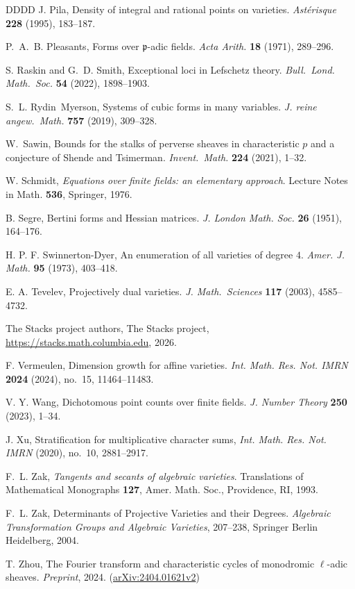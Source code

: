 \documentclass[a4paper,11pt, twoside,reqno]{amsart}
\theoremstyle{plain}
\theoremstyle{definition}
\theoremstyle{remark}
\numberwithin{equation}{section}
\begin{document}
\begin{thebibliography}{DDDD}
J. Pila,
Density of integral and rational points on varieties.
{\em Ast\'erisque} {\bf 228} (1995), 183--187.

P.~A.~B. Pleasants, Forms over ${ \mathfrak{p}}$-adic fields. {\em Acta Arith.} {\bf 18} (1971), 289--296.

S. Raskin and G.~D. Smith, Exceptional loci in Lefschetz theory. {\em Bull.\ Lond. Math.\ Soc.} {\bf 54} (2022), 1898--1903.


S.~L. Rydin~Myerson, Systems of cubic forms in many variables. {\em J. reine angew.\ Math.} {\bf 757} (2019), 309--328.


W.~Sawin, Bounds for the stalks of perverse sheaves in characteristic $p$ and a conjecture of Shende and Tsimerman.
{\em Invent.\ Math.} {\bf 224} (2021), 1--32.

W. Schmidt,  {\em Equations over finite fields: an elementary approach}. Lecture Notes in Math. {\bf 536},  Springer, 1976.

 B. Segre,
Bertini forms and {H}essian matrices.
  {\em J. London Math. Soc.} {\bf 26}
(1951),
     164--176.

 H. P. F. Swinnerton-Dyer, An enumeration of all varieties of degree {$4$}.
{\em Amer. J. Math.} {\bf 95} (1973), 403--418.


E. A. Tevelev, Projectively dual varieties.
{\em J. Math.\ Sciences} {\bf 117} (2003), 4585--4732.


 The {Stacks project authors},
The Stacks project,
\url{https://stacks.math.columbia.edu},
2026.

F. Vermeulen,
Dimension growth for affine varieties.
{\em Int. Math. Res. Not. IMRN} {\bf 2024} (2024), no.~15,
11464--11483.

 V. Y. Wang, Dichotomous point counts over finite fields.
{\em J. Number Theory} {\bf 250} (2023), 1--34.

J. Xu, Stratification for multiplicative character sums,
\emph{Int. Math. Res. Not. IMRN} (2020), no.~10, 2881--2917.

F.~L. Zak, {\em Tangents and secants of algebraic varieties}. 
Translations of Mathematical Monographs {\bf 127}, Amer. Math. Soc., Providence, RI, 1993.

F.~L. Zak, Determinants of Projective Varieties and their Degrees.
{\em Algebraic Transformation Groups and Algebraic Varieties},
207--238, Springer Berlin Heidelberg, 2004.



T. Zhou, The Fourier transform and characteristic cycles
of monodromic $\ell$-adic sheaves. {\em Preprint}, 2024. 
(\href{https://arxiv.org/abs/2404.01621v2}{arXiv:2404.01621v2})

\end{thebibliography}
\end{document}

